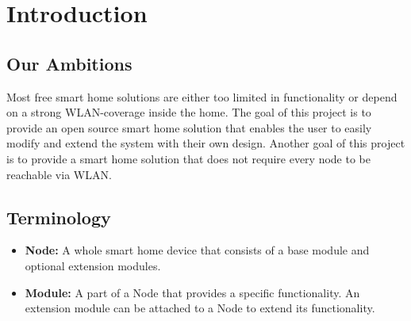 \chapter{Introduction}
\renewcommand*\chapterpagestyle{scrheadings}

    \section{Our Ambitions}
        Most free smart home solutions are either too limited in
        functionality or depend on a strong WLAN-coverage inside the
        home.
        The goal of this project is to provide an open source
        smart home solution that enables the user to easily modify 
        and extend the system with their own design. Another goal of
        this project is to provide a smart home solution that does
        not require every node to be reachable via WLAN.

    \section{Terminology}
        \begin{itemize}
            \item \textbf{Node:} A whole smart home device that
            consists of a base module and optional extension modules.

            \item \textbf{Module:} A part of a Node that provides
            a specific functionality. An extension module can be
            attached to a Node to extend its functionality.

        \end{itemize}


    
